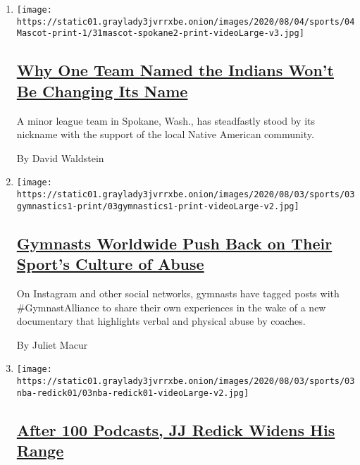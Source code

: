 \begin{enumerate}
\def\labelenumi{\arabic{enumi}.}
\item
  \texttt{[image: https://static01.graylady3jvrrxbe.onion/images/2020/08/04/sports/04Mascot-print-1/31mascot-spokane2-print-videoLarge-v3.jpg]}

  \hypertarget{why-one-team-named-the-indians-wont-be-changing-its-name}{%
  \subsection{\texorpdfstring{\href{/2020/08/03/sports/baseball/indians-team-names-mascots.html}{Why
  One Team Named the Indians Won't Be Changing Its
  Name}}{Why One Team Named the Indians Won't Be Changing Its Name}}\label{why-one-team-named-the-indians-wont-be-changing-its-name}}

  A minor league team in Spokane, Wash., has steadfastly stood by its
  nickname with the support of the local Native American community.

  By David Waldstein
\item
  \texttt{[image: https://static01.graylady3jvrrxbe.onion/images/2020/08/03/sports/03gymnastics1-print/03gymnastics1-print-videoLarge-v2.jpg]}

  \hypertarget{gymnasts-worldwide-push-back-on-their-sports-culture-of-abuse}{%
  \subsection{\texorpdfstring{\href{/2020/08/03/sports/olympics/gymnastics-abuse-athlete-a.html}{Gymnasts
  Worldwide Push Back on Their Sport's Culture of
  Abuse}}{Gymnasts Worldwide Push Back on Their Sport's Culture of Abuse}}\label{gymnasts-worldwide-push-back-on-their-sports-culture-of-abuse}}

  On Instagram and other social networks, gymnasts have tagged posts
  with \#GymnastAlliance to share their own experiences in the wake of a
  new documentary that highlights verbal and physical abuse by coaches.

  By Juliet Macur
\item
  \texttt{[image: https://static01.graylady3jvrrxbe.onion/images/2020/08/03/sports/03nba-redick01/03nba-redick01-videoLarge-v2.jpg]}

  \hypertarget{after-100-podcasts-jj-redick-widens-his-range}{%
  \subsection{\texorpdfstring{\href{/2020/08/03/sports/jj-redick-podcast.html}{After
  100 Podcasts, JJ Redick Widens His
  Range}}{After 100 Podcasts, JJ Redick Widens His Range}}\label{after-100-podcasts-jj-redick-widens-his-range}}


\end{enumerate}
